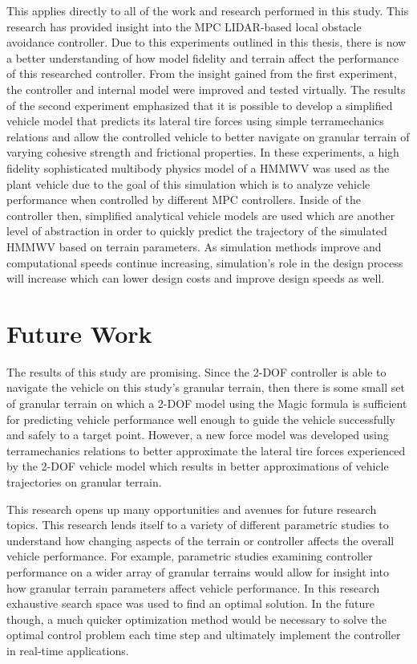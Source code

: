 \documentclass[12pt,onecolumn]{report}
\newcommand{\CHRONO}{{\sffamily{{Chrono}}}}
\begin{document}
This applies directly to all of the work and research performed in this study. This research has provided insight into the MPC LIDAR-based local obstacle avoidance controller. Due to this experiments outlined in this thesis, there is now a better understanding of how model fidelity and terrain affect the performance of this researched controller. From the insight gained from the first experiment, the controller and internal model were improved and tested virtually. The results of the second experiment emphasized that it is possible to develop a simplified vehicle model that predicts its lateral tire forces using simple terramechanics relations and allow the controlled vehicle to better navigate on granular terrain of varying cohesive strength and frictional properties. In these experiments, a high fidelity sophisticated multibody physics model of a HMMWV was used as the plant vehicle due to the goal of this simulation which is to analyze vehicle performance when controlled by different MPC controllers. Inside of the controller then, simplified analytical vehicle models are used which are another level of abstraction in order to quickly predict the trajectory of the simulated HMMWV based on terrain parameters. As simulation methods improve and computational speeds continue increasing, simulation's role in the design process will increase which can lower design costs and improve design speeds as well. 

\section{Future Work}\label{s:FutureWork}

The results of this study are promising. Since the 2-DOF controller is able to navigate the {\CHRONO} vehicle on this study's granular terrain, then there is some small set of granular terrain on which a 2-DOF model using the Magic formula is sufficient for predicting vehicle performance well enough to guide the vehicle successfully and safely to a target point. However, a new force model was developed using terramechanics relations to better approximate the lateral tire forces experienced by the 2-DOF vehicle model which results in better approximations of vehicle trajectories on granular terrain.

This research opens up many opportunities and avenues for future research topics. This research lends itself to a variety of different parametric studies to understand how changing aspects of the terrain or controller affects the overall vehicle performance. For example, parametric studies examining controller performance on a wider array of granular terrains would allow for insight into how granular terrain parameters affect vehicle performance. In this research exhaustive search space was used to find an optimal solution. In the future though, a much quicker optimization method would be necessary to solve the optimal control problem each time step and ultimately implement the controller in real-time applications. 
\end{document}
